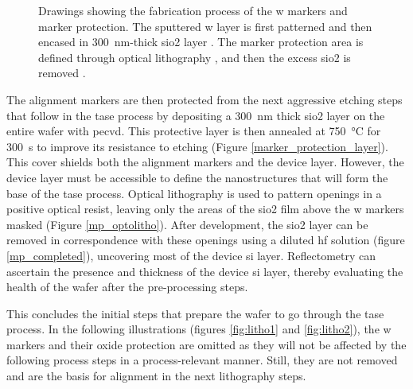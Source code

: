 \begin{figure}
{    }
    \caption[Drawings showing the fabrication process of the \acs{w} markers and marker protection.]{Drawings showing the fabrication process of the \acs{w} markers and marker protection. The sputtered \acs{w} layer  is first patterned  and then encased in \qty{300}{\nm}-thick \acs{sio2} layer . The marker protection area is defined through optical lithography , and then the excess \acs{sio2} is removed .}
    \label{fig:markers}
\end{figure}

\par
The alignment markers are then protected from the next aggressive etching steps that follow in the \acs{tase} process by depositing a \qty{300}{\nm} thick \acl{sio2} layer on the entire wafer with \acs{pecvd}. This protective layer is then annealed at \qty{750}{\degreeCelsius} for \qty{300}{s} to improve its resistance to etching (Figure \ref{marker_protection_layer}). This cover shields both the alignment markers and the device layer. However, the device layer must be accessible to define the nanostructures that will form the base of the \acs{tase} process. Optical lithography is used to pattern openings in a positive optical resist, leaving only the areas of the \acs{sio2} film above the \acl{w} markers masked (Figure \ref{mp_optolitho}). After development, the \acl{sio2} layer can be removed in correspondence with these openings using a diluted \acf{hf} solution (figure \ref{mp_completed}), uncovering most of the device \acl{si} layer. Reflectometry can ascertain the presence and thickness of the device \acl{si} layer, thereby evaluating the health of the wafer after the pre-processing steps.
\par
This concludes the initial steps that prepare the wafer to go through the \acs{tase} process. In the following illustrations (figures \ref{fig:litho1} and \ref{fig:litho2}), the \acl{w} markers and their oxide protection are omitted as they will not be affected by the following process steps in a process-relevant manner. Still, they are not removed and are the basis for alignment in the next lithography steps.


